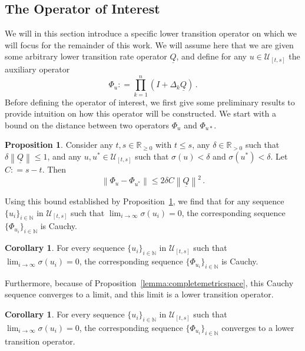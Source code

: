 \documentclass[10pt,a4paper]{paper}
\theoremstyle{definition}
\newtheorem{proposition}[theorem]{Proposition}
\newtheorem{corollary}[theorem]{Corollary}
\newcommand{\nats}{\mathbb{N}}
\newcommand{\reals}{\mathbb{R}}
\newcommand{\realspos}{\reals_{>0}}
\newcommand{\realsnonneg}{\reals_{\geq 0}}
\newcommand{\lrate}{\underline{Q}}
\newcommand{\norm}[1]{\left\lVert #1 \right\rVert}
\newcommand{\coloneqq}{:\!=}
\begin{document}
\subsection{The Operator of Interest}

We will in this section introduce a specific lower transition operator on which we will focus for the remainder of this work. We will assume here that we are given some arbitrary lower transition rate operator $\lrate$, and define for any $u\in\mathcal{U}_{[t,s]}$ the auxiliary operator
\begin{equation}\label{eq:aux_lower_trans}
\Phi_u\coloneqq\prod_{k=1}^n(I+\Delta_k\lrate)\,.
\end{equation}
Before defining the operator of interest, we first give some preliminary results to provide intuition on how this operator will be constructed. We start with a bound on the distance between two operators $\Phi_u$ and $\Phi_{u*}$.

\begin{proposition}\label{prop:differencebetweenu}
Consider any $t,s\in\realsnonneg$ with $t\leq s$, any $\delta\in\realspos$ such that $\delta\norm{\lrate}\leq1$, and any $u,u^*\in\mathcal{U}_{[t,s]}$ such that $\sigma(u)<\delta$ and $\sigma(u^*)<\delta$. Let $C\coloneqq s-t$. Then
\begin{equation*}
\norm{\Phi_u-\Phi_{u^*}}\leq 2\delta C\norm{\lrate}^2\,.
\end{equation*}
\end{proposition}

Using this bound established by Proposition~\ref{prop:differencebetweenu}, we find that for any sequence $\{u_i\}_{i\in\nats}$ in $\mathcal{U}_{[t,s]}$ such that $\lim_{i\to\infty}\sigma(u_i)=0$, the corresponding sequence $\{\Phi_{u_i}\}_{i\in\nats}$ is Cauchy.

\begin{corollary}\label{corol:cauchy}
For every sequence $\{u_i\}_{i\in\nats}$ in $\mathcal{U}_{[t,s]}$ such that $\lim_{i\to\infty}\sigma(u_i)=0$, the corresponding sequence $\{\Phi_{u_i}\}_{i\in\nats}$ is Cauchy.
\end{corollary}

Furthermore, because of Proposition~\ref{lemma:completemetricspace}, this Cauchy sequence converges to a limit, and this limit is a lower transition operator.

\begin{corollary}\label{corol:limitexistsandiscoherent}
For every sequence $\{u_i\}_{i\in\nats}$ in $\mathcal{U}_{[t,s]}$ such that $\lim_{i\to\infty}\sigma(u_i)=0$, the corresponding sequence $\{\Phi_{u_i}\}_{i\in\nats}$ converges to a lower transition operator.
\end{corollary}
\end{document}
